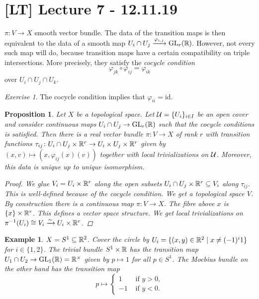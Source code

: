 \documentclass[A4paper, british]{amsart}
\theoremstyle{darkgreentheorem}
\newtheorem{prop}[thm]{Proposition}
\theoremstyle{darkbluedefinition}
\theoremstyle{darkredexample}
\newtheorem{exa}[thm]{Example}
\theoremstyle{remark}
\newtheorem{exe}[thm]{Exercise}
\DeclareMathOperator{\GL}{GL}
\newcommand{\1}{\mathbbm{1}}
\newcommand{\id}{\mathrm{id}}
\newcommand{\tms}{\times}
\newcommand{\sub}{\subseteq}
\begin{document}
\section{[LT] Lecture 7 - 12.11.19}

$\pi\colon V\to X$ smooth vector bundle.
The data of the transition maps is then equivalent to the data of a smooth map $U_{i}\cap U_{j}\xrightarrow{\varphi_{i,j}}\GL_{r}(\R)$.
However, not every such map will do, because transition maps have a certain compatibility on triple intersections.
More precisely, they satisfy the \textit{cocycle condition}
\[ \varphi_{jk}\circ \varphi_{ij}=\varphi_{ik} \]
over $U_{i}\cap U_{j}\cap U_{k}$.

\begin{exe}
    The cocycle condition implies that $\varphi_{ii}=\id$.
\end{exe}

\begin{prop}
    Let $X$ be a topological space.
    Let $\mathcal{U}=\{U_{i}\}_{i\in I}$ be an open cover and consider continuous maps $U_{i}\cap U_{j}\to \GL_{r}(\R)$ such that the cocycle conditions is satisfied.
    Then there is a real vector bundle $\pi\colon V\to X$ of rank $r$ with transition functions $\tau_{ij}\colon U_{i}\cap U_{j}\tms \R^{r}\to U_{i}\times U_{j}\tms \R^{r}$ given by $(x,v)\mapsto (x,\varphi_{ij}(x)(v))$ together with local trivializations on $\mathcal{U}$.
    Moreover, this data is unique up to unique isomorphism.
    \begin{proof}
	We glue $V_{i}=U_{i}\times \mathbb{R}^{r}$ along the open subsets $U_{i}\cap U_{j}\tms \R^{r}\sub V_{i}$ along $\tau_{ij}$.
	This is well-defined because of the cocycle condition.
	We get a topological space $V$.
	By construction there is a continuous map $\pi\colon V\to X$.
	The fibre above $x$ is $\{x\}\tms \R^{r}$.
	This defines a vector space structure.
	We get local trivializations on $\pi^{-1}(U_{i})\cong V_{i}\xrightarrow{\sim}U_{i}\tms \R^{r}$.
    \end{proof}
\end{prop}

\begin{exa}
    $X=S^{1}\sub \R^{2}$.
    Cover the circle by $U_{i}=\{(x,y)\in \mathbb{R}^{2}\mid x\neq (-1)^{i}1\}$ for $i\in \{1,2\}$.
    The trivial bundle $S^{1}\tms \R$ has the transition map $U_{1}\cap U_{2}\to \GL_{1}(\R)=\R^{\tms}$ given by $p\mapsto 1$ for all $p\in S^{1}$.
    The Moebius bundle on the other hand has the transition map
    \[ p\mapsto \begin{cases} 1 &\text{ if } y>0, \\ -1 &\text{ if } y<0.\end{cases} \]
\end{exa}
\end{document}
